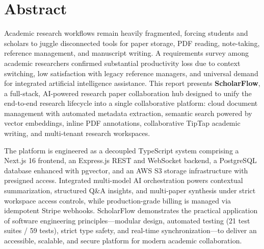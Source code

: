 \section*{Abstract}

Academic research workflows remain heavily fragmented, forcing students and scholars to juggle disconnected tools for paper storage, PDF reading, note-taking, reference management, and manuscript writing. A requirements survey among academic researchers confirmed substantial productivity loss due to context switching, low satisfaction with legacy reference managers, and universal demand for integrated artificial intelligence assistance. This report presents \textbf{ScholarFlow}, a full-stack, AI-powered research paper collaboration hub designed to unify the end-to-end research lifecycle into a single collaborative platform: cloud document management with automated metadata extraction, semantic search powered by vector embeddings, inline PDF annotations, collaborative TipTap academic writing, and multi-tenant research workspaces.

The platform is engineered as a decoupled TypeScript system comprising a Next.js 16 frontend, an Express.js REST and WebSocket backend, a PostgreSQL database enhanced with pgvector, and an AWS S3 storage infrastructure with presigned access. Integrated multi-model AI orchestration powers contextual summarization, structured Q\&A insights, and multi-paper synthesis under strict workspace access controls, while production-grade billing is managed via idempotent Stripe webhooks. ScholarFlow demonstrates the practical application of software engineering principles---modular design, automated testing (21 test suites / 59 tests), strict type safety, and real-time synchronization---to deliver an accessible, scalable, and secure platform for modern academic collaboration.
